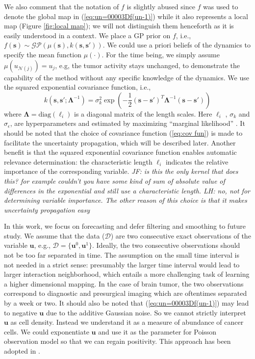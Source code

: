 \documentclass[smallextended,natbib]{svjour3}       %
\begin{document}
We also comment that the notation of $f$ is slightly abused since $f$ was used to denote the global map in (\ref{eq:un=00003Df(un-1)}) while it also represents a local map (Figure \ref{fig:local map}); we will not distinguish them henceforth as it is easily understood in a context. We place a GP prior on $f$, i.e., $f(\mathbf{s})\sim\mathcal{GP}(\mu(\mathbf{s}),k(\mathbf{s},\mathbf{s}'))$. We could use a priori beliefs of the dynamics to specify the mean function $\mu(\cdot)$. For the time being, we simply assume $\mu(u_{\mathcal{N}(j)})=u_{j}$, e.g, the tumor activity stays unchanged, to demonstrate the capability of the method without any specific knowledge of the dynamics. We use the squared exponential covariance function, i.e., 
\begin{equation}
k(\mathbf{s},\mathbf{s}';\boldsymbol{\Lambda}^{-1})=\sigma_{k}^{2}\exp(-\frac{1}{2}(\mathbf{s-s}')^{T}\boldsymbol{\Lambda}^{-1}(\mathbf{s-s}')) \label{eq:cov fun}
\end{equation}
 where $\boldsymbol{\Lambda}=\text{diag}(\ell_{i})$ is a diagonal matrix of the length scales. Here $\ell_{i}$ , $\sigma_{k}$ and  $\sigma_{\epsilon}$, are hyperparameters and estimated by maximizing ``marginal likelihood'' \citep{Rasmussen2006}. It should be noted that the choice of covariance function (\ref{eq:cov fun}) is made to facilitate the uncertainty propagation, which will be described later. Another benefit is that the squared exponential covariance function enables automatic relevance determination: the characteristic length $\ell_{i}$ indicates the relative importance of the corresponding variable. \emph{JF: is this the only kernel that does this?  for example couldn't you have some kind of sum of absolute value of differences in the exponential and still use a characteristic length. LH: no, not for determining variable importance. The other reason of this choice is that it makes uncertainty propagation easy}
 
In this work, we focus on forecasting and defer filtering and smoothing to future study. We assume that the data ($\mathcal{D}$) are two consecutive exact observations of the variable $\mathbf{u}$, e.g., $\mathcal{D}=\{\mathbf{u}^{0},\mathbf{u}^{1}\}$.  Ideally, the two consecutive observations should not be too far separated in time.  The assumption on the small time interval is not needed in a strict sense: presumably the larger time interval would lead to larger interaction neighborhood, which entails a more challenging task of learning a higher dimensional mapping. In the case of brain tumor, the two observations  correspond to diagnostic and presurgical imaging which are oftentimes separated by a week or two.  It should also be noted that (\ref{eq:un=00003Df(un-1)}) may lead to negative $\mathbf{u}$ due to the additive Gaussian noise. So we cannot strictly interpret $\mathbf{u}$ as cell density. Instead we understand it as a measure of abundance of cancer cells. We could exponentiate $\mathbf{u}$ and use it as the parameter for Poisson observation model so that we can regain positivity. This approach has been adopted in \citep{Hooten2008}.
\end{document}
